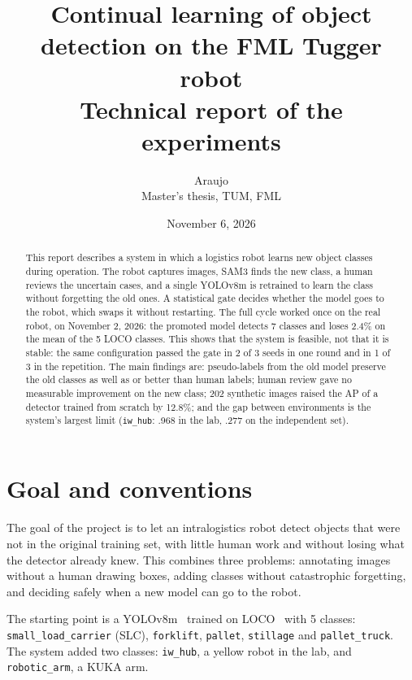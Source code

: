 \documentclass[11pt,a4paper]{article}
\title{Continual learning of object detection on the FML Tugger robot\\[4pt]
\large Technical report of the experiments}
\author{Araujo\\Master's thesis, TUM, FML}
\date{November 6, 2026}
\begin{document}
\maketitle

\begin{abstract}
This report describes a system in which a logistics robot learns new object
classes during operation. The robot captures images, SAM3 finds the new class, a
human reviews the uncertain cases, and a single YOLOv8m is retrained to learn the
class without forgetting the old ones. A statistical gate decides whether the
model goes to the robot, which swaps it without restarting. The full cycle worked
once on the real robot, on November 2, 2026: the promoted model detects 7 classes
and loses 2.4\% on the mean of the 5 LOCO classes. This shows that the system is
feasible, not that it is stable: the same configuration passed the gate in 2 of 3
seeds in one round and in 1 of 3 in the repetition. The main findings are:
pseudo-labels from the old model preserve the old classes as well as or better
than human labels; human review gave no measurable improvement on the new class;
202 synthetic images raised the AP of a detector trained from scratch by 12.8\%;
and the gap between environments is the system's largest limit (\texttt{iw\_hub}:
.968 in the lab, .277 on the independent set).
\end{abstract}

\tableofcontents
\newpage

\section{Goal and conventions}

The goal of the project is to let an intralogistics robot detect objects that
were not in the original training set, with little human work and without losing
what the detector already knew. This combines three problems: annotating images
without a human drawing boxes, adding classes without catastrophic forgetting,
and deciding safely when a new model can go to the robot.

The starting point is a YOLOv8m~\cite{yolov8} trained on LOCO~\cite{loco} with 5
classes: \texttt{small\_load\_carrier} (SLC), \texttt{forklift}, \texttt{pallet},
\texttt{stillage} and \texttt{pallet\_truck}. The system added two classes:
\texttt{iw\_hub}, a yellow robot in the lab, and \texttt{robotic\_arm}, a KUKA
arm.
\end{document}
